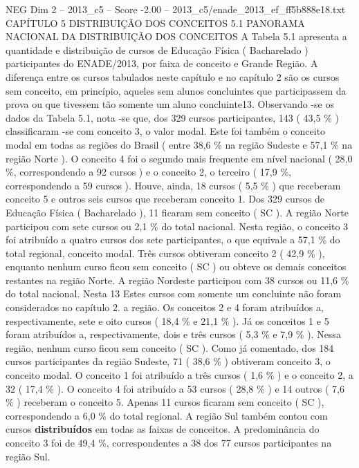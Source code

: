 \begin{textsample}{NEG Dim 2 – 2013\_c5 – Score -2.00 – 2013\_c5/enade\_2013\_ef\_ff5b888e18.txt}  \label{ex:f2_neg_066}
CAPÍTULO 5 DISTRIBUIÇÃO DOS CONCEITOS 5.1 PANORAMA NACIONAL DA DISTRIBUIÇÃO DOS CONCEITOS A Tabela 5.1 apresenta a quantidade e distribuição de cursos de Educação Física ( Bacharelado ) participantes do ENADE/2013, por faixa de conceito e Grande Região.
A diferença entre os cursos tabulados neste capítulo e no capítulo 2 são os cursos sem conceito, em princípio, aqueles sem alunos concluintes que participassem da prova ou que tivessem tão somente um aluno concluinte13.
Observando -se os dados da Tabela 5.1, nota -se que, dos 329 cursos participantes, 143 ( 43,5 \% ) classificaram -se com conceito 3, o valor modal.
Este foi também o conceito modal em todas as regiões do Brasil ( entre 38,6 \% na região Sudeste e 57,1 \% na região Norte ).
O conceito 4 foi o segundo mais frequente em nível nacional ( 28,0 \%, correspondendo a 92 cursos ) e o conceito 2, o terceiro ( 17,9 \%, correspondendo a 59 cursos ).
Houve, ainda, 18 cursos ( 5,5 \% ) que receberam conceito 5 e outros seis cursos que receberam conceito 1.
Dos 329 cursos de Educação Física ( Bacharelado ), 11 ficaram sem conceito ( SC ).
A região Norte participou com sete cursos ou 2,1 \% do total nacional.
Nesta região, o conceito 3 foi atribuído a quatro cursos dos sete participantes, o que equivale a 57,1 \% do total regional, conceito modal.
Três cursos obtiveram conceito 2 ( 42,9 \% ), enquanto nenhum curso ficou sem conceito ( SC ) ou obteve os demais conceitos restantes na região Norte.
A região Nordeste participou com 38 cursos ou 11,6 \% do total nacional.
Nesta 13 Estes cursos com somente um concluinte não foram considerados no capítulo 2. a região.
Os conceitos 2 e 4 foram atribuídos a, respectivamente, sete e oito cursos ( 18,4 \% e 21,1 \% ).
Já os conceitos 1 e 5 foram atribuídos a, respectivamente, dois e três cursos ( 5,3 \% e 7,9 \% ).
Nessa região, nenhum curso ficou sem conceito ( SC ).
Como já comentado, dos 184 cursos participantes da região Sudeste, 71 ( 38,6 \% ) obtiveram conceito 3, o conceito modal.
O conceito 1 foi atribuído a três cursos ( 1,6 \% ) e o conceito 2, a 32 ( 17,4 \% ).
O conceito 4 foi atribuído a 53 cursos ( 28,8 \% ) e 14 outros ( 7,6 \% ) receberam o conceito 5.
Apenas 11 cursos ficaram sem conceito ( SC ), correspondendo a 6,0 \% do total regional.
A região Sul também contou com cursos \textbf{distribuídos} em todas as faixas de conceitos.
A predominância do conceito 3 foi de 49,4 \%, correspondentes a 38 dos 77 cursos participantes na região Sul.

\end{textsample}
